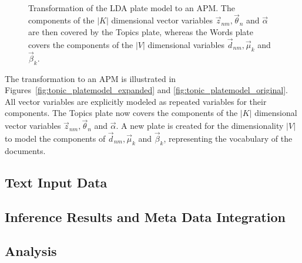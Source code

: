 \begin{figure}[t]
\begin{minipage}[t]{0.49\linewidth}
	\begin{center}
	\end{center}
\end{minipage}
\hspace{0.0cm}
\begin{minipage}[t]{0.49\linewidth}
	\begin{center}
	\end{center}
\end{minipage}\\
\caption[Transformation of LDA plate model to an APM]{Transformation of the LDA plate model to an APM. The components of the $|K|$ dimensional vector variables $\vec z_{nm}, \vec \theta_n$ and $\vec \alpha$ are then covered by the Topics plate, whereas the Words plate covers the components of the $|V|$ dimensional variables $\vec d_{nm}, \vec \mu_k$ and $\vec \beta_k$.}
\label{img:topic_platemodels}
\end{figure}

The transformation to an APM is illustrated in Figures~\ref{fig:topic_platemodel_expanded} and \ref{fig:topic_platemodel_original}. All vector variables are explicitly modeled as repeated variables for their components. The Topics plate now covers the components of the $|K|$ dimensional vector variables $\vec z_{nm}, \vec \theta_n$ and $\vec \alpha$. A new plate is created for the dimensionality $|V|$ to model the components of $\vec d_{nm}, \vec \mu_k$ and $\vec \beta_k$, representing the vocabulary of the documents.

\subsection{Text Input Data}

\subsection{Inference Results and Meta Data Integration}

\subsection{Analysis}
